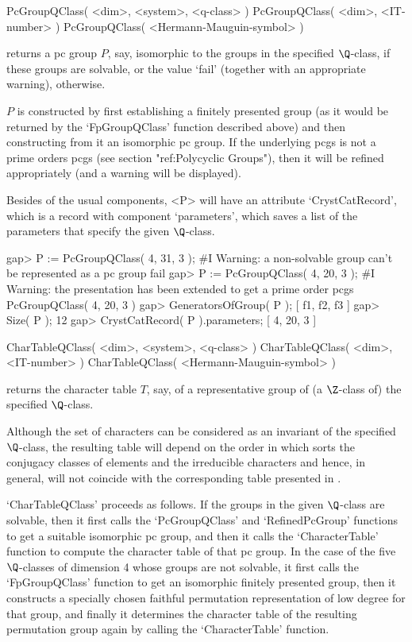 \>PcGroupQClass( <dim>, <system>, <q-class> )
\>PcGroupQClass( <dim>, <IT-number> )
\>PcGroupQClass( <Hermann-Mauguin-symbol> )

returns a pc group $P$, say, isomorphic to the groups in the
specified $\Q$-class, if these groups are solvable, or the value
`fail' (together with an appropriate warning), otherwise.

$P$ is constructed by first establishing a finitely presented group
(as it would be returned by the `FpGroupQClass' function described
above) and then constructing from it an isomorphic pc group.  If the
underlying pcgs is not a prime orders pcgs (see section "ref:Polycyclic
Groups"), then it will be refined appropriately (and a warning will 
be displayed).

Besides of the usual components, <P> will have an attribute
`CrystCatRecord', which is a record with component
`parameters', which saves a list of the parameters that specify 
the given $\Q$-class.

\beginexample
gap> P := PcGroupQClass( 4, 31, 3 );
#I  Warning: a non-solvable group can't be represented as a pc group
fail
gap> P := PcGroupQClass( 4, 20, 3 );
#I  Warning: the presentation has been extended to get a prime order pcgs
PcGroupQClass( 4, 20, 3 )
gap> GeneratorsOfGroup( P );
[ f1, f2, f3 ]
gap> Size( P );
12
gap> CrystCatRecord( P ).parameters;
[ 4, 20, 3 ]
\endexample

\>CharTableQClass( <dim>, <system>, <q-class> )
\>CharTableQClass( <dim>, <IT-number> )
\>CharTableQClass( <Hermann-Mauguin-symbol> )

returns the character table $T$, say, of a representative group of (a
$\Z$-class of) the specified $\Q$-class.

Although the set of characters  can be considered as  an invariant of the
specified $\Q$-class,  the resulting  table  will depend on  the order in
which {\GAP} sorts the conjugacy classes of  elements and the irreducible
characters  and    hence,  in  general,   will  not   coincide  with  the
corresponding table presented in \cite{BBNWZ78}.

`CharTableQClass' proceeds as follows.  If the groups in the given
$\Q$-class are solvable, then it first calls the `PcGroupQClass' and
`RefinedPcGroup' functions to get a suitable isomorphic pc group, and 
then it calls the `CharacterTable' function to compute the
character table of that pc group.  In the case of the five
$\Q$-classes of dimension 4 whose groups are not solvable, it first
calls the `FpGroupQClass' function to get an isomorphic finitely
presented group, then it constructs a specially chosen faithful
permutation representation of low degree for that group, and finally
it determines the character table of the resulting permutation group
again by calling the `CharacterTable' function.


